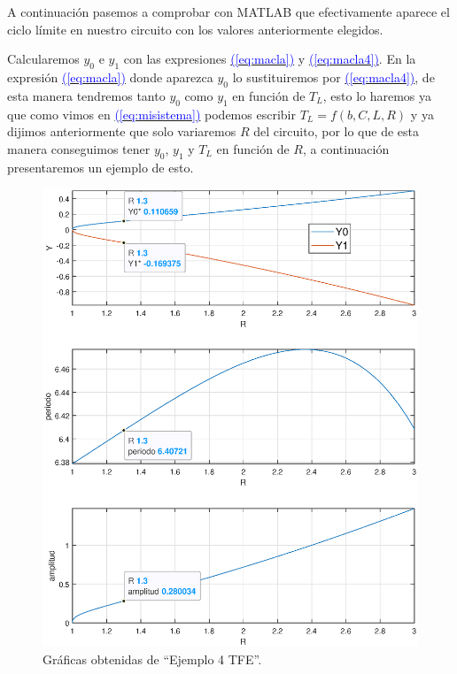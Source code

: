 \documentclass[12pt,a4paper]{report} %
\newcommand{\eref}[1]{\hyperref[#1]{\textcolor{blue}{(\ref*{#1})}}}
\begin{document}
	\vspace{0.5cm} A continuación pasemos a comprobar con MATLAB que efectivamente aparece el ciclo límite en nuestro circuito con los valores anteriormente elegidos.
	
	 \vspace{0.5cm}\noindent Calcularemos $y_0$ e $y_1$ con las expresiones \eref{eq:macla} y \eref{eq:macla4}. En la expresión \eref{eq:macla} donde aparezca $y_0$ lo sustituiremos por \eref{eq:macla4}, de esta manera tendremos tanto $y_0$ como $y_1$ en función de $T_L$, esto lo haremos ya que como vimos en \eref{eq:misistema} podemos escribir $T_L=f(b,C,L,R)$ y ya dijimos anteriormente que solo variaremos $R$ del circuito, por lo que de esta manera conseguimos tener $y_0$, $y_1$ y $T_L$ en función de $R$, a continuación presentaremos un ejemplo de esto.
	
	\newpage
	
	
	
	\newpage
	
	
	
	\newpage

	\begin{figure}[h]
	\centering
	\includegraphics[width=1\textwidth]{ejem4amplitud.eps}
	\caption{Gráficas obtenidas de ``Ejemplo 4 TFE''.}
	\label{fig:ejem4}
	\end{figure}\smallskip
\end{document}
